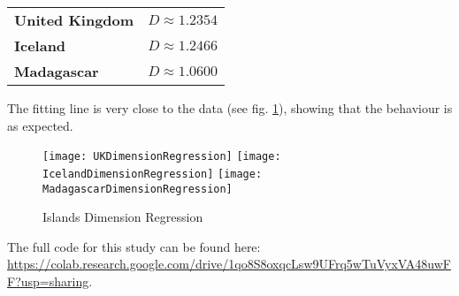 \begin{tabular}{l l}\label{table:islandsDimensionRegression}
	\textbf{United Kingdom} & $D \approx 1.2354$ \\
	\textbf{Iceland}        & $D \approx 1.2466$ \\
	\textbf{Madagascar}     & $D \approx 1.0600$
\end{tabular}

The fitting line is very close to the data (see fig. \ref{fig:islandsDimensionRegression}), showing that the behaviour is as expected.

\begin{figure}[!h]
	\texttt{[image: UKDimensionRegression]}
	\hspace{0.25cm}
	\texttt{[image: IcelandDimensionRegression]}
	\hspace{0.25cm}
	\texttt{[image: MadagascarDimensionRegression]}
	\centering
	\caption{Islands Dimension Regression}
	\label{fig:islandsDimensionRegression}
\end{figure}

The full code for this study can be found here: \url{https://colab.research.google.com/drive/1qo8S8oxqcLsw9UFrq5wTuVyxVA48uwFF?usp=sharing}.

